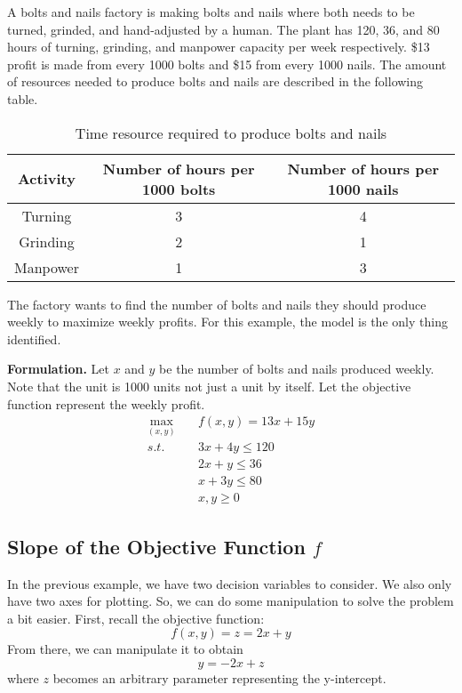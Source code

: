 \begin{example}
A bolts and nails factory is making bolts and nails where both needs to be turned,
grinded, and hand-adjusted by a human. The plant has 120, 36, and 80 hours of
turning, grinding, and manpower capacity per week respectively. \$13 profit is made
from every 1000 bolts and \$15 from every 1000 nails. The amount of resources needed 
to produce bolts and nails are described in the following table.

\begin{table}[H]
    \centering
    \begin{tabular}{|c|c|c|}
        \hline
        Activity & Number of hours per 1000 bolts & Number of hours per 1000 nails\\
        \hline
        Turning & 3 & 4\\
        Grinding & 2 & 1\\
        Manpower & 1 & 3\\
        \hline
    \end{tabular}
    \caption{Time resource required to produce bolts and nails}
\end{table}

The factory wants to find the number of bolts and nails they should produce weekly to 
maximize weekly profits. For this example, the model is the only thing identified.

\textbf{Formulation. } Let $x$ and $y$ be the number of bolts and nails produced weekly.
Note that the unit is 1000 units not just a unit by itself. Let the objective function 
represent the weekly profit.
\begin{equation}
    \begin{aligned}
        \max_{(x, y)} \quad & f(x, y) = 13x + 15y\\
        s.t. \quad & 3x + 4y \leq 120\\
        & 2x + y \leq 36\\
        & x + 3y \leq 80\\
        & x, y \geq 0
    \end{aligned}
\end{equation}
\end{example}

\subsection*{Slope of the Objective Function $f$}

In the previous example, we have two decision variables to consider. We also only have
two axes for plotting. So, we can do some manipulation to solve the problem a bit 
easier. First, recall the objective function: \[ f(x, y) = z = 2x + y \] From there, 
we can manipulate it to obtain 
\begin{equation}\label{slope-of-f}
y = -2x + z 
\end{equation}
where $z$ becomes an arbitrary parameter representing the y-intercept.

